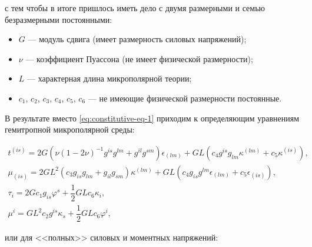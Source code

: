 с тем чтобы в итоге пришлось иметь дело с двумя размерными и семью безразмерными постоянными:

\begin{itemize}

\item \(G\) \cdash--- модуль сдвига (имеет размерность силовых напряжений);

\item \(\nu\) \cdash--- коэффициент Пуассона (не имеет физической размерности);

\item \(L\) \cdash--- характерная длина микрополярной теории;

\item \(c_1\), \(c_2\), \(c_3\), \(c_4\), \(c_5\), \(c_6\) \cdash--- не имеющие физической размерности постоянные.



\end{itemize}



В результате вместо \eqref{eq:constitutive-eq-1} приходим к определяющим уравнениям гемитропной микрополярной среды:

\begin{equation}

\begin{array}{l}

t^{(is)}=2G\left({\nu(1-2\nu)^{-1}g^{is}g^{lm}+g^{il}g^{sm}}\right)\epsilon_{(lm)}+

GL(c_4g^{is}g_{lm}\kappa^{(lm)}+c_5\kappa^{(is)}),\\

%

\mu_{(is)}=2GL^2(c_3g_{is}g_{lm}+g_{il}g_{sm})\kappa^{(lm)}+

GL(c_4g_{is}g^{lm}\epsilon_{(lm)}+c_5\epsilon_{(is)}),\\

%

\tau_i=2Gc_1g_{is}\varphi^s+\dfrac{1}{2}GLc_6\kappa_i,\\

%

\mu^i=GL^2c_2g^{is}\kappa_s+\dfrac{1}{2}GLc_6\varphi^i,

\end{array}

\end{equation}

или для <<полных>> силовых и моментных напряжений: 

